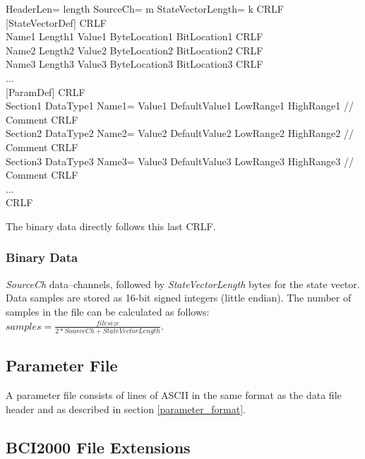 \documentclass[letterpaper,oneside,12pt]{book}
\begin{document}
\begin{flushleft}
HeaderLen= length  SourceCh= m  StateVectorLength= k CRLF \\[1ex]
[StateVectorDef] CRLF \\[1ex]
Name1 Length1 Value1 ByteLocation1 BitLocation1 CRLF \\[1ex]
Name2 Length2 Value2 ByteLocation2 BitLocation2 CRLF \\[1ex]
Name3 Length3 Value3 ByteLocation3 BitLocation3 CRLF \\[1ex]
... \\[1ex]
[ParamDef] CRLF \\[1ex]
Section1 DataType1 Name1= Value1 DefaultValue1 LowRange1 HighRange1 // Comment CRLF \\[1ex]
Section2 DataType2 Name2= Value2 DefaultValue2 LowRange2 HighRange2 // Comment CRLF \\[1ex]
Section3 DataType3 Name3= Value3 DefaultValue3 LowRange3 HighRange3 // Comment CRLF \\[1ex]
... \\[1ex]
CRLF \\
\end{flushleft}
The binary data directly follows this last CRLF.

\subsubsection{Binary Data}
\label{binary_data}

\textit{SourceCh} data--channels, followed by \textit{StateVectorLength} bytes 
for the state vector. Data samples are stored as 16-bit signed integers (little 
endian). The number of samples in the file can be calculated as follows: 
$samples=\frac{filesize}{2*SourceCh+StateVectorLength}$.

\subsection{Parameter File}

A parameter file consists of lines of ASCII in the same format as the data file 
header and as described in section \ref{parameter_format}.

\newpage
\subsection{BCI2000 File Extensions}
\end{document}
